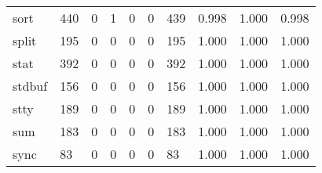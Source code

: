 \begin{longtable}{lp{2.0cm}p{2.0cm}p{2.0cm}p{2.0cm}p{2.0cm}p{2.0cm}p{2.0cm}p{2.0cm}p{2.0cm}}
sort      &                    440 &                                             0 &                                            1 &                                           0 &                                            0 &                                        439 &                                0.998 &                                  1.000 &                                0.998 \\
split     &                    195 &                                             0 &                                            0 &                                           0 &                                            0 &                                        195 &                                1.000 &                                  1.000 &                                1.000 \\
stat      &                    392 &                                             0 &                                            0 &                                           0 &                                            0 &                                        392 &                                1.000 &                                  1.000 &                                1.000 \\
stdbuf    &                    156 &                                             0 &                                            0 &                                           0 &                                            0 &                                        156 &                                1.000 &                                  1.000 &                                1.000 \\
stty      &                    189 &                                             0 &                                            0 &                                           0 &                                            0 &                                        189 &                                1.000 &                                  1.000 &                                1.000 \\
sum       &                    183 &                                             0 &                                            0 &                                           0 &                                            0 &                                        183 &                                1.000 &                                  1.000 &                                1.000 \\
sync      &                     83 &                                             0 &                                            0 &                                           0 &                                            0 &                                         83 &                                1.000 &                                  1.000 &                                1.000 \\

\end{longtable}

